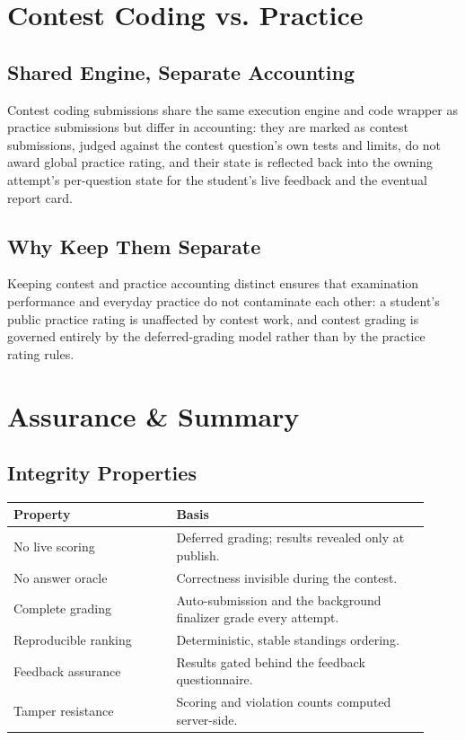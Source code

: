 \documentclass[12pt,a4paper,oneside]{report}
\begin{document}
\chapter{Contest Coding vs. Practice}
\section{Shared Engine, Separate Accounting}
Contest coding submissions share the same execution engine and code wrapper as
practice submissions but differ in accounting: they are marked as contest
submissions, judged against the contest question's own tests and limits, do not
award global practice rating, and their state is reflected back into the owning
attempt's per-question state for the student's live feedback and the eventual
report card.

\section{Why Keep Them Separate}
Keeping contest and practice accounting distinct ensures that examination
performance and everyday practice do not contaminate each other: a student's
public practice rating is unaffected by contest work, and contest grading is
governed entirely by the deferred-grading model rather than by the practice
rating rules.

\chapter{Assurance \& Summary}
\section{Integrity Properties}
\begin{longtable}{@{}p{0.36\linewidth} p{0.56\linewidth}@{}}
\toprule
\textbf{Property} & \textbf{Basis}\\
\midrule
\endhead
No live scoring & Deferred grading; results revealed only at publish.\\
No answer oracle & Correctness invisible during the contest.\\
Complete grading & Auto-submission and the background finalizer grade every attempt.\\
Reproducible ranking & Deterministic, stable standings ordering.\\
Feedback assurance & Results gated behind the feedback questionnaire.\\
Tamper resistance & Scoring and violation counts computed server-side.\\
\bottomrule
\end{longtable}
\end{document}
